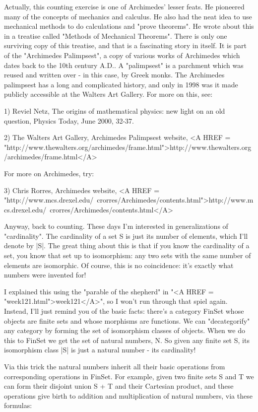Actually, this counting exercise is one of Archimedes' lesser feats.
He pioneered many of the concepts of mechanics and calculus.  He also
had the neat idea to use mechanical methods to do calculations and 
"prove theorems".  He wrote about this in a treatise called "Methods of 
Mechanical Theorems".  There is only one surviving copy of this treatise,
and that is a fascinating story in itself.  It is part of the "Archimedes 
Palimpsest", a copy of various works of Archimedes which dates back to the 
10th century A.D..   A "palimpsest" is a parchment which was reused and
written over - in this case, by Greek monks.   The Archimedes palimpsest
has a long and complicated history, and only in 1998 was it made publicly
accessible at the Walters Art Gallery.  For more on this, see:

1) Reviel Netz, The origins of mathematical physics: new light on
an old question, Physics Today, June 2000, 32-37.

2) The Walters Art Gallery, Archimedes Palimpsest website,
<A HREF = "http://www.thewalters.org/archimedes/frame.html">http://www.thewalters.org/archimedes/frame.html</A>

For more on Archimedes, try:

3) Chris Rorres, Archimedes website,
<A HREF = "http://www.mcs.drexel.edu/~crorres/Archimedes/contents.html">http://www.mcs.drexel.edu/~crorres/Archimedes/contents.html</A>

Anyway, back to counting.  These days I'm interested in generalizations of 
"cardinality".  The cardinality of a set S is just its number of elements, 
which I'll denote by |S|.  The great thing about this is that if you know 
the cardinality of a set, you know that set up to isomorphism: any two 
sets with the same number of elements are isomorphic.   Of course, this 
is no coincidence: it's exactly what numbers were invented for!  

I explained this using the "parable of the shepherd" in "<A HREF = "week121.html">week121</A>", so I
won't run through that spiel again.  Instead, I'll just remind you 
of the basic facts: there's a category FinSet whose objects are
finite sets and whose morphisms are functions.  We can "decategorify" 
any category by forming the set of isomorphism classes of objects.  
When we do this to FinSet we get the set of natural numbers, N.  So 
given any finite set S, its isomorphism class |S| is just a natural 
number - its cardinality!

Via this trick the natural numbers inherit all their basic operations
from corresponding operations in FinSet.   For example, given two 
finite sets S and T we can form their disjoint union S + T and their
Cartesian product, and these operations give birth to addition and 
multiplication of natural numbers, via these formulas:

